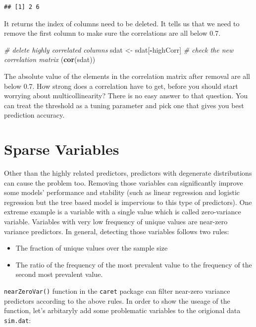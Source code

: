 \documentclass[12pt,]{krantz}
\makeatletter
\newenvironment{Shaded}{\begin{snugshade}}{\end{snugshade}}
\newcommand{\CommentTok}[1]{\textcolor[rgb]{0.37,0.37,0.37}{\textit{#1}}}
\newcommand{\KeywordTok}[1]{\textcolor[rgb]{0.27,0.27,0.27}{\textbf{#1}}}
\newcommand{\NormalTok}[1]{#1}
\newcommand{\OperatorTok}[1]{\textcolor[rgb]{0.43,0.43,0.43}{\textbf{#1}}}
\newcommand{\StringTok}[1]{\textcolor[rgb]{0.5,0.5,0.5}{#1}}
\providecommand{\tightlist}{%
  \setlength{\itemsep}{0pt}\setlength{\parskip}{0pt}}
\newenvironment{kframe}{%
\medskip{}
\setlength{\fboxsep}{.8em}
 \def\at@end@of@kframe{}%
 \ifinner\ifhmode%
  \def\at@end@of@kframe{\end{minipage}}%
  \begin{minipage}{\columnwidth}%
 \fi\fi%
 \def\FrameCommand##1{\hskip\@totalleftmargin \hskip-\fboxsep
 \colorbox{shadecolor}{##1}\hskip-\fboxsep
     \hskip-\linewidth \hskip-\@totalleftmargin \hskip\columnwidth}%
 \MakeFramed {\advance\hsize-\width
   \@totalleftmargin\z@ \linewidth\hsize
   \@setminipage}}%
 {\par\unskip\endMakeFramed%
 \at@end@of@kframe}
\renewenvironment{Shaded}{\begin{kframe}}{\end{kframe}}
\makeatother
\begin{document}
\begin{verbatim}
## [1] 2 6
\end{verbatim}

It returns the index of columns need to be deleted. It tells us that we need to remove the first column to make sure the correlations are all below 0.7.

\begin{Shaded}
\begin{Highlighting}[]
\CommentTok{# delete highly correlated columns}
\NormalTok{sdat <-}\StringTok{ }\NormalTok{sdat[}\OperatorTok{-}\NormalTok{highCorr]}
\CommentTok{# check the new correlation matrix}
\NormalTok{(}\KeywordTok{cor}\NormalTok{(sdat))}
\end{Highlighting}
\end{Shaded}

The absolute value of the elements in the correlation matrix after removal are all below 0.7. How strong does a correlation have to get, before you should start worrying about multicollinearity? There is no easy answer to that question. You can treat the threshold as a tuning parameter and pick one that gives you best prediction accuracy.

\hypertarget{sparse-variables}{%
\section{Sparse Variables}\label{sparse-variables}}

Other than the highly related predictors, predictors with degenerate distributions can cause the problem too. Removing those variables can significantly improve some models' performance and stability (such as linear regression and logistic regression but the tree based model is impervious to this type of predictors). One extreme example is a variable with a single value which is called zero-variance variable. Variables with very low frequency of unique values are near-zero variance predictors. In general, detecting those variables follows two rules:

\begin{itemize}
\tightlist
\item
  The fraction of unique values over the sample size
\item
  The ratio of the frequency of the most prevalent value to the frequency of the second most prevalent value.
\end{itemize}

\texttt{nearZeroVar()} function in the \texttt{caret} package can filter near-zero variance predictors according to the above rules. In order to show the useage of the function, let's arbitaryly add some problematic variables to the origional data \texttt{sim.dat}:
\end{document}
